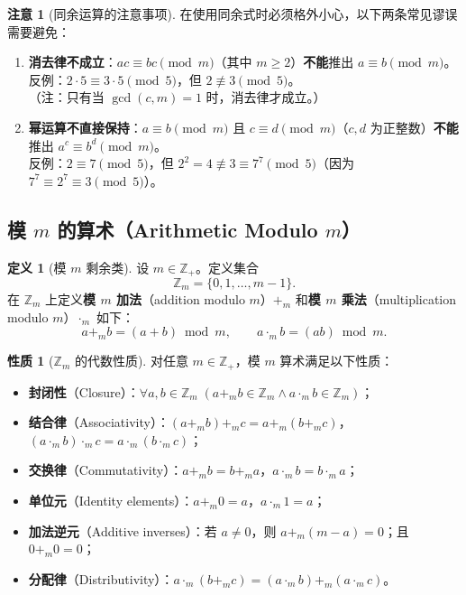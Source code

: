 \documentclass[UTF8,11pt,a4paper]{ctexbook}   %
\theoremstyle{definition}
\newtheorem{definition}{定义}[section]
\newtheorem{property}{性质}[section]
\newtheorem{warning}{注意}[section]
\begin{document}
\begin{warning}[同余运算的注意事项]
在使用同余式时必须格外小心，以下两条常见谬误需要避免：
\begin{enumerate}
    \item \textbf{消去律不成立}：$ac\equiv bc\pmod m$（其中 $m\ge 2$）\textbf{不能}推出 $a\equiv b\pmod m$。\\
    反例：$2\cdot 5\equiv 3\cdot 5\pmod 5$，但 $2\not\equiv 3\pmod 5$。\\
    （注：只有当 $\gcd(c,m)=1$ 时，消去律才成立。）
    \item \textbf{幂运算不直接保持}：$a\equiv b\pmod m$ 且 $c\equiv d\pmod m$（$c,d$ 为正整数）\textbf{不能}推出 $a^c\equiv b^d\pmod m$。\\
    反例：$2\equiv 7\pmod 5$，但 $2^2=4\not\equiv 3\equiv 7^7\pmod 5$（因为 $7^7\equiv 2^7\equiv 3\pmod 5$）。
\end{enumerate}
\end{warning}

\subsection{模 \texorpdfstring{$m$}{m} 的算术（Arithmetic Modulo \texorpdfstring{$m$}{m}）}

\begin{definition}[模 $m$ 剩余类]
设 $m\in\mathbb{Z}_+$。定义集合
\[
\mathbb{Z}_m = \{0,1,\dots,m-1\}.
\]
在 $\mathbb{Z}_m$ 上定义\textbf{模 $m$ 加法}（addition modulo $m$）$+_m$ 和\textbf{模 $m$ 乘法}（multiplication modulo $m$）$\cdot_m$ 如下：
\[
a+_m b = (a+b)\bmod m,\qquad a\cdot_m b = (ab)\bmod m.
\]
\end{definition}

\begin{property}[$\mathbb{Z}_m$ 的代数性质]
对任意 $m\in\mathbb{Z}_+$，模 $m$ 算术满足以下性质：
\begin{itemize}
    \item \textbf{封闭性}（Closure）：$\forall a,b\in\mathbb{Z}_m\;(a+_m b\in\mathbb{Z}_m\land a\cdot_m b\in\mathbb{Z}_m)$；
    \item \textbf{结合律}（Associativity）：$(a+_m b)+_m c = a+_m(b+_m c)$，$(a\cdot_m b)\cdot_m c = a\cdot_m(b\cdot_m c)$；
    \item \textbf{交换律}（Commutativity）：$a+_m b = b+_m a$，$a\cdot_m b = b\cdot_m a$；
    \item \textbf{单位元}（Identity elements）：$a+_m 0 = a$，$a\cdot_m 1 = a$；
    \item \textbf{加法逆元}（Additive inverses）：若 $a\neq 0$，则 $a+_m(m-a)=0$；且 $0+_m 0=0$；
    \item \textbf{分配律}（Distributivity）：$a\cdot_m(b+_m c) = (a\cdot_m b)+_m(a\cdot_m c)$。
\end{itemize}
\end{property}
\end{document}
